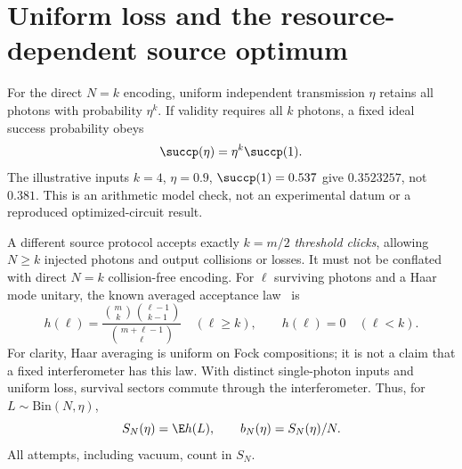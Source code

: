 \section{Uniform loss and the resource-dependent source optimum}\label{sec:loss}
For the direct $N=k$ encoding, uniform independent transmission $\eta$ retains all photons with probability $\eta^k$. If validity requires all $k$ photons, a fixed ideal success probability obeys
\begin{equation}
 \succp(\eta)=\eta^k\succp(1).\label{eq:all_detected}
\end{equation}
The illustrative inputs $k=4$, $\eta=0.9$, $\succp(1)=0.537$ give $0.3523257$, not $0.381$. This is an arithmetic model check, not an experimental datum or a reproduced optimized-circuit result.

A different source protocol accepts exactly $k=m/2$ \emph{threshold clicks}, allowing $N\ge k$ injected photons and output collisions or losses. It must not be conflated with direct $N=k$ collision-free encoding. For $\ell$ surviving photons and a Haar mode unitary, the known averaged acceptance law~\cite[Lemma 1, Eq.~(6), v2]{bouland2023} is
\begin{equation}
 h(\ell)=\frac{\binom{m}{k}\binom{\ell-1}{k-1}}{\binom{m+\ell-1}{\ell}}\quad(\ell\ge k),\qquad h(\ell)=0\quad(\ell<k).\label{eq:haar_click}
\end{equation}
For clarity, Haar averaging is uniform on Fock compositions; it is not a claim that a fixed interferometer has this law. With distinct single-photon inputs and uniform loss, survival sectors commute through the interferometer. Thus, for $L\sim\mathrm{Bin}(N,\eta)$,
\begin{equation}
 S_N(\eta)=\E h(L),\qquad b_N(\eta)=S_N(\eta)/N.\label{eq:source}
\end{equation}
All attempts, including vacuum, count in $S_N$.

